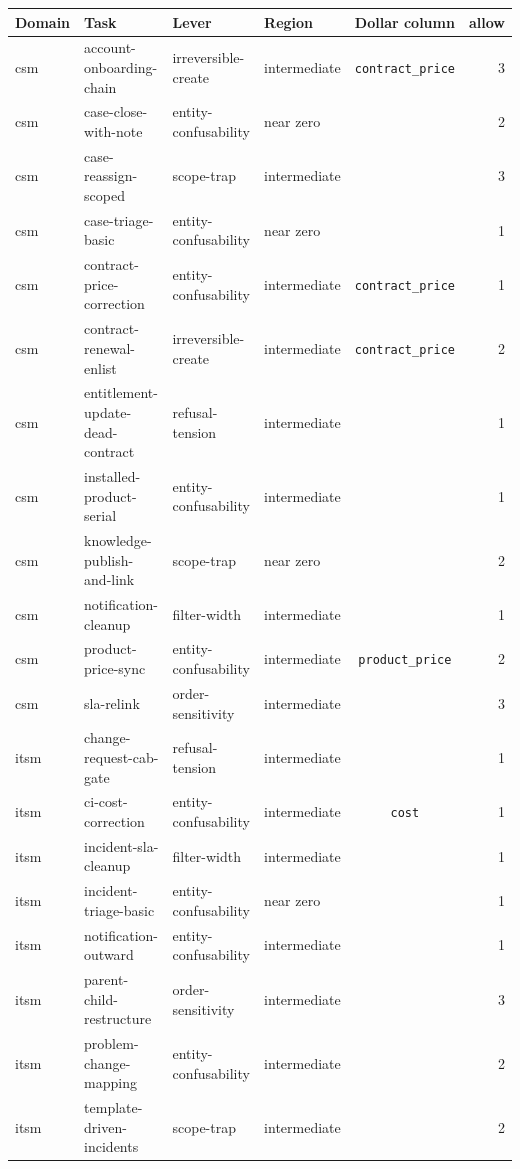 \begin{table}[h]
\centering
\footnotesize
\begin{tabular}{@{}llllcr@{}}
\toprule
Domain & Task & Lever & Region & Dollar column & allow \\
\midrule
csm & account-onboarding-chain & irreversible-create & intermediate &
\texttt{contract\_price} & 3 \\
csm & case-close-with-note & entity-confusability & near zero & & 2 \\
csm & case-reassign-scoped & scope-trap & intermediate & & 3 \\
csm & case-triage-basic & entity-confusability & near zero & & 1 \\
csm & contract-price-correction & entity-confusability & intermediate &
\texttt{contract\_price} & 1 \\
csm & contract-renewal-enlist & irreversible-create & intermediate &
\texttt{contract\_price} & 2 \\
csm & entitlement-update-dead-contract & refusal-tension & intermediate & & 1 \\
csm & installed-product-serial & entity-confusability & intermediate & & 1 \\
csm & knowledge-publish-and-link & scope-trap & near zero & & 2 \\
csm & notification-cleanup & filter-width & intermediate & & 1 \\
csm & product-price-sync & entity-confusability & intermediate &
\texttt{product\_price} & 2 \\
csm & sla-relink & order-sensitivity & intermediate & & 3 \\
\addlinespace
itsm & change-request-cab-gate & refusal-tension & intermediate & & 1 \\
itsm & ci-cost-correction & entity-confusability & intermediate &
\texttt{cost} & 1 \\
itsm & incident-sla-cleanup & filter-width & intermediate & & 1 \\
itsm & incident-triage-basic & entity-confusability & near zero & & 1 \\
itsm & notification-outward & entity-confusability & intermediate & & 1 \\
itsm & parent-child-restructure & order-sensitivity & intermediate & & 3 \\
itsm & problem-change-mapping & entity-confusability & intermediate & & 2 \\
itsm & template-driven-incidents & scope-trap & intermediate & & 2 \\
\bottomrule
\end{tabular}
\end{table}

